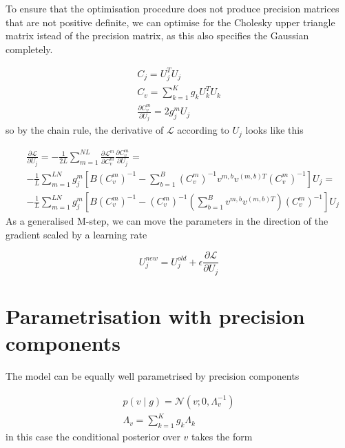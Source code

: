 \documentclass{paper}
\begin{document}
To ensure that the optimisation procedure does not produce precision matrices that are not positive definite, we can optimise for the Cholesky upper triangle matrix istead of the precision matrix, as this also specifies the Gaussian completely.

\begin{eqnarray}
C_j = U_j^T U_j \\
C_v = \sum_{k=1}^K g_k U_k^T U_k \\
\frac{\partial C_v^m}{\partial U_j} = 2 g_j^m U_j
\end{eqnarray}
%
so by the chain rule, the derivative of $\mathcal{L}$ according to $U_j$ looks like this

\begin{equation}
\begin{split}
&\frac{\partial \mathcal{L}}{\partial U_j} = -\frac{1}{2L} \sum_{m=1}^{NL} \frac{\partial \mathcal{L}^m}{\partial C_v^m} \frac{\partial C_v^m}{\partial U_j} = \\
& -\frac{1}{L} \sum_{m=1}^{LN} g_j^{m} \left[ B \left( C_v^m \right)^{-1} - \sum_{b=1}^B \left( C_v^m \right)^{-1} v^{m,b} v^{(m,b)T} \left( C_v^m \right)^{-1} \right] U_j = \\
& -\frac{1}{L} \sum_{m=1}^{LN} g_j^{m} \left[ B \left( C_v^m \right)^{-1} -  \left( C_v^m \right)^{-1} \left( \sum_{b=1}^B v^{m,b} v^{(m,b)T} \right) \left( C_v^m \right)^{-1} \right] U_j
\end{split}
\end{equation}
%
As a generalised M-step, we can move the parameters in the direction of the gradient scaled by a learning rate

\begin{equation}
U_j^{new} = U_j^{old} + \epsilon \frac{\partial \mathcal{L}}{\partial U_j}
\end{equation}

\section{Parametrisation with precision components}

The model can be equally well parametrised by precision components

\begin{eqnarray}
p(v \mid g) = \mathcal{N}(v; 0,\Lambda_v^{-1}) \\
\Lambda_v = \sum_{k=1}^K g_k \Lambda_k \label{eq:cv}
\end{eqnarray}
%
in this case the conditional posterior over $v$ takes the form
\end{document}
